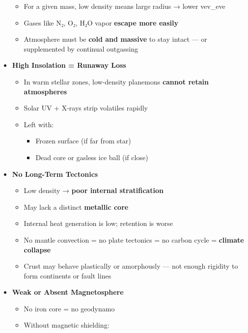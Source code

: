 \documentclass[
  letterpaper,
]{book}
\providecommand{\tightlist}{%
  \setlength{\itemsep}{0pt}\setlength{\parskip}{0pt}}
\begin{document}
\begin{itemize}
  \begin{itemize}
  \tightlist
  \item
    For a given mass, low density means large radius → lower
    vev\_eve\hspace{0pt}
  \item
    Gases like N₂, O₂, H₂O vapor \textbf{escape more easily}
  \item
    Atmosphere must be \textbf{cold and massive} to stay intact --- or
    supplemented by continual outgassing
  \end{itemize}
\item
  \textbf{High Insolation = Runaway Loss}

  \begin{itemize}
  \tightlist
  \item
    In warm stellar zones, low-density planemons \textbf{cannot retain
    atmospheres}
  \item
    Solar UV + X-rays strip volatiles rapidly
  \item
    Left with:

    \begin{itemize}
    \tightlist
    \item
      Frozen surface (if far from star)
    \item
      Dead core or gasless ice ball (if close)
    \end{itemize}
  \end{itemize}
\item
  \textbf{No Long-Term Tectonics}

  \begin{itemize}
  \tightlist
  \item
    Low density → \textbf{poor internal stratification}\\
  \item
    May lack a distinct \textbf{metallic core}\\
  \item
    Internal heat generation is low; retention is worse
  \item
    No mantle convection = no plate tectonics = no carbon cycle =
    \textbf{climate collapse}
  \item
    Crust may behave plastically or amorphously --- not enough rigidity
    to form continents or fault lines
  \end{itemize}
\item
  \textbf{Weak or Absent Magnetosphere}

  \begin{itemize}
  \tightlist
  \item
    No iron core = no geodynamo
  \item
    Without magnetic shielding:


\end{itemize}
\end{itemize}
\end{document}
